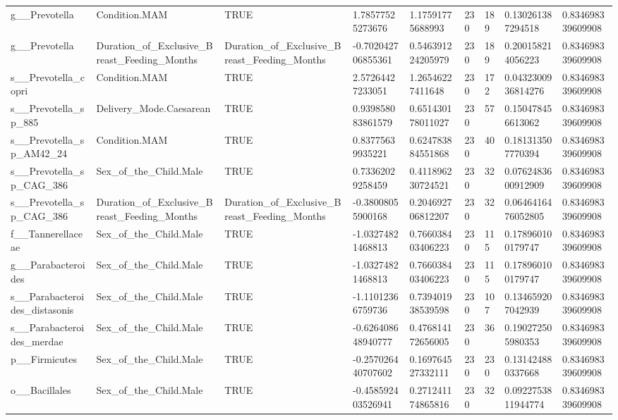 \begin{longtable}{lllllllll}
g\_\_Prevotella & Condition.MAM & TRUE & 1.78577525273676 & 1.17591775688993 & 230 & 189 & 0.130261387294518 & 0.834698339609908 \\
g\_\_Prevotella & Duration\_of\_Exclusive\_Breast\_Feeding\_Months & Duration\_of\_Exclusive\_Breast\_Feeding\_Months & -0.702042706855361 & 0.546391224205979 & 230 & 189 & 0.200158214056223 & 0.834698339609908 \\
s\_\_Prevotella\_copri & Condition.MAM & TRUE & 2.57264427233051 & 1.26546227411648 & 230 & 172 & 0.0432300936814276 & 0.834698339609908 \\
s\_\_Prevotella\_sp\_885 & Delivery\_Mode.Caesarean & TRUE & 0.939858083861579 & 0.651430178011027 & 230 & 57 & 0.150478456613062 & 0.834698339609908 \\
s\_\_Prevotella\_sp\_AM42\_24 & Condition.MAM & TRUE & 0.83775639935221 & 0.624783884551868 & 230 & 40 & 0.181313507770394 & 0.834698339609908 \\
s\_\_Prevotella\_sp\_CAG\_386 & Sex\_of\_the\_Child.Male & TRUE & 0.73362029258459 & 0.411896230724521 & 230 & 32 & 0.0762483600912909 & 0.834698339609908 \\
s\_\_Prevotella\_sp\_CAG\_386 & Duration\_of\_Exclusive\_Breast\_Feeding\_Months & Duration\_of\_Exclusive\_Breast\_Feeding\_Months & -0.38008055900168 & 0.204692706812207 & 230 & 32 & 0.0646416476052805 & 0.834698339609908 \\
f\_\_Tannerellaceae & Sex\_of\_the\_Child.Male & TRUE & -1.03274821468813 & 0.766038403406223 & 230 & 115 & 0.178960100179747 & 0.834698339609908 \\
g\_\_Parabacteroides & Sex\_of\_the\_Child.Male & TRUE & -1.03274821468813 & 0.766038403406223 & 230 & 115 & 0.178960100179747 & 0.834698339609908 \\
s\_\_Parabacteroides\_distasonis & Sex\_of\_the\_Child.Male & TRUE & -1.11012366759736 & 0.739401938539598 & 230 & 107 & 0.134659207042939 & 0.834698339609908 \\
s\_\_Parabacteroides\_merdae & Sex\_of\_the\_Child.Male & TRUE & -0.626408648940777 & 0.476814172656005 & 230 & 36 & 0.190272505980353 & 0.834698339609908 \\
p\_\_Firmicutes & Sex\_of\_the\_Child.Male & TRUE & -0.257026440707602 & 0.169764527332111 & 230 & 230 & 0.131424880337668 & 0.834698339609908 \\
o\_\_Bacillales & Sex\_of\_the\_Child.Male & TRUE & -0.458592403526941 & 0.271241174865816 & 230 & 32 & 0.0922753811944774 & 0.834698339609908 \\

\end{longtable}
